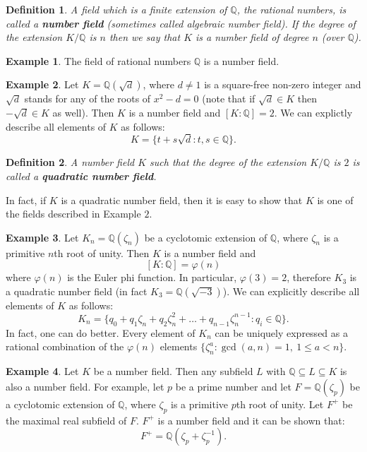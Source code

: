 \documentclass[12pt]{article}
\newtheorem{defn}{Definition}
\theoremstyle{definition}
\newtheorem{exa}{Example}
\newcommand{\Rats}{\mathbb{Q}}
\begin{document}
\begin{defn}
A field which is a finite extension of $\mathbb{Q}$, the rational numbers, is called a {\bf number field} (sometimes called {\em algebraic number field}). If the degree of the extension $K/\Rats$ is $n$ then we say that $K$ is a number field of degree $n$ (over $\Rats$).\\
\end{defn}

\begin{exa}
The field of rational numbers $\Rats$ is a number field.\\
\end{exa}

\begin{exa}
Let $K=\Rats(\sqrt{d})$, where $d\neq 1$ is a square-free non-zero integer and $\sqrt{d}$ stands for any of the roots of $x^2-d=0$ (note that if $\sqrt{d}\in K$ then $-\sqrt{d}\in K$ as well). Then $K$ is a number field and $[K:\Rats]=2$. We can explictly describe all elements of $K$ as follows:
$$K=\{ t+s\sqrt{d} : t,s \in \Rats \}.$$ 
\end{exa}

\begin{defn}
A number field $K$ such that the degree of the extension $K/\Rats$ is $2$ is called a {\bf quadratic number field}.
\end{defn}

In fact, if $K$ is a quadratic number field, then it is easy to show that $K$ is one of the fields described in Example $2$.

\begin{exa}
Let $K_n=\Rats(\zeta_n)$ be a cyclotomic extension of $\Rats$, where $\zeta_n$ is a primitive $n$th root of unity. Then $K$ is a number field and 
$$[K:\Rats]=\varphi(n)$$
where $\varphi(n)$ is the Euler phi function. In particular, $\varphi(3)=2$, therefore $K_3$ is a quadratic number field (in fact $K_3=\Rats(\sqrt{-3})$). We can explicitly describe all elements of $K$ as follows:
$$K_n=\{ q_0+q_1\zeta_n+q_2\zeta_n^2+\ldots+q_{n-1}\zeta_n^{n-1} : q_i\in \Rats \}.$$
In fact, one can do better. Every element of $K_n$ can be uniquely expressed as a rational combination of the $\varphi(n)$ elements $\{\zeta_n^a : \gcd(a,n)=1,\ 1\leq a < n\}$.
\end{exa}

\begin{exa}
Let $K$ be a number field. Then any subfield $L$ with $\Rats \subseteq L \subseteq K$ is also a number field. For example, let $p$ be a prime number and let $F=\Rats(\zeta_p)$ be a cyclotomic extension of $\Rats$, where $\zeta_p$ is a primitive $p$th root of unity. Let $F^+$ be the maximal real subfield of $F$. $F^{+}$ is a number field and it can be shown that:
$$F^+=\Rats(\zeta_p+\zeta_p^{-1}).$$
\end{exa}
\end{document}
